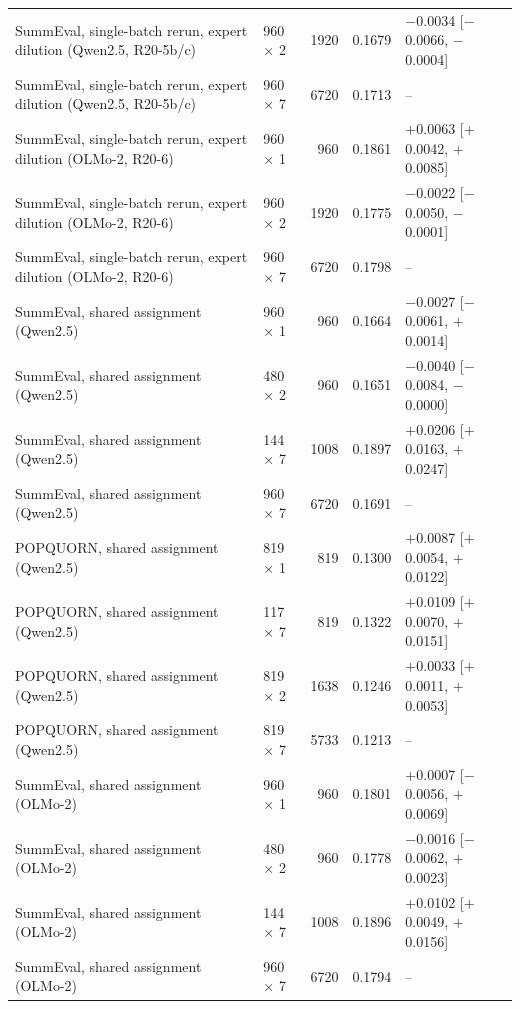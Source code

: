 \begin{table}[t]
{\begin{tabular}{llrrl}
SummEval, single-batch rerun, expert dilution (Qwen2.5, R20-5b/c) & 960 $\times$ 2 & 1920 & 0.1679 & $-$0.0034 [$-$0.0066, $-$0.0004] \\
SummEval, single-batch rerun, expert dilution (Qwen2.5, R20-5b/c) & 960 $\times$ 7 & 6720 & 0.1713 & -- \\
\midrule
SummEval, single-batch rerun, expert dilution (OLMo-2, R20-6) & 960 $\times$ 1 & 960 & 0.1861 & $+$0.0063 [$+$0.0042, $+$0.0085] \\
SummEval, single-batch rerun, expert dilution (OLMo-2, R20-6) & 960 $\times$ 2 & 1920 & 0.1775 & $-$0.0022 [$-$0.0050, $-$0.0001] \\
SummEval, single-batch rerun, expert dilution (OLMo-2, R20-6) & 960 $\times$ 7 & 6720 & 0.1798 & -- \\
\midrule
SummEval, shared assignment (Qwen2.5) & 960 $\times$ 1 & 960 & 0.1664 & $-$0.0027 [$-$0.0061, $+$0.0014] \\
SummEval, shared assignment (Qwen2.5) & 480 $\times$ 2 & 960 & 0.1651 & $-$0.0040 [$-$0.0084, $-$0.0000] \\
SummEval, shared assignment (Qwen2.5) & 144 $\times$ 7 & 1008 & 0.1897 & $+$0.0206 [$+$0.0163, $+$0.0247] \\
SummEval, shared assignment (Qwen2.5) & 960 $\times$ 7 & 6720 & 0.1691 & -- \\
\midrule
POPQUORN, shared assignment (Qwen2.5) & 819 $\times$ 1 & 819 & 0.1300 & $+$0.0087 [$+$0.0054, $+$0.0122] \\
POPQUORN, shared assignment (Qwen2.5) & 117 $\times$ 7 & 819 & 0.1322 & $+$0.0109 [$+$0.0070, $+$0.0151] \\
POPQUORN, shared assignment (Qwen2.5) & 819 $\times$ 2 & 1638 & 0.1246 & $+$0.0033 [$+$0.0011, $+$0.0053] \\
POPQUORN, shared assignment (Qwen2.5) & 819 $\times$ 7 & 5733 & 0.1213 & -- \\
\midrule
SummEval, shared assignment (OLMo-2) & 960 $\times$ 1 & 960 & 0.1801 & $+$0.0007 [$-$0.0056, $+$0.0069] \\
SummEval, shared assignment (OLMo-2) & 480 $\times$ 2 & 960 & 0.1778 & $-$0.0016 [$-$0.0062, $+$0.0023] \\
SummEval, shared assignment (OLMo-2) & 144 $\times$ 7 & 1008 & 0.1896 & $+$0.0102 [$+$0.0049, $+$0.0156] \\
SummEval, shared assignment (OLMo-2) & 960 $\times$ 7 & 6720 & 0.1794 & -- \\
\bottomrule\end{tabular}}\end{table}